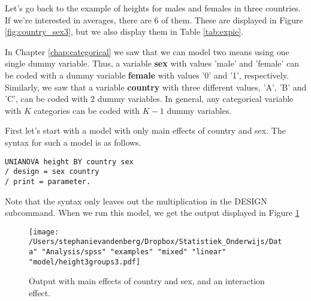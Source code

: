 Let's go back to the example of heights for males and females in three countries. If we're interested in averages, there are 6 of them. These are displayed in Figure \ref{fig:country_sex3}, but we also display them in Table \ref{tab:expie}.

In Chapter \ref{chap:categorical} we saw that we can model two means using one single dummy variable. Thus, a variable \textbf{sex} with values 'male' and 'female' can be coded with a dummy variable \textbf{female} with values '0' and '1', respectively. Similarly, we saw that a variable \textbf{country} with three different values, 'A', 'B' and 'C', can be coded with 2 dummy variables. In general, any categorical variable with $K$ categories can be coded with $K-1$ dummy variables.

% 

First let's start with a model with only main effects of country and sex. The syntax for such a model is as follows.

\begin{verbatim}
UNIANOVA height BY country sex 
/ design = sex country 
/ print = parameter.
\end{verbatim}

Note that the syntax only leaves out the multiplication in the DESIGN subcommand. When we run this model, we get the output displayed in Figure \ref{fig:interactionheightcountrysexMAIN}

\begin{figure}[h]
    \begin{center}
       \texttt{[image: /Users/stephanievandenberg/Dropbox/Statistiek\_Onderwijs/Data" "Analysis/spss" "examples" "mixed" "linear" "model/height3groups3.pdf]}
    \end{center}
    \caption{Output with main effects of country and sex, and an interaction effect.}
    \label{fig:interactionheightcountrysexMAIN}
\end{figure}

